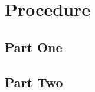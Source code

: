\documentclass{article}
\begin{document}
\section{Procedure}
\label{sec:procedure}

\subsection{Part One}
\label{sec:part_one}


\subsection{Part Two}
\label{sec:part_two}

\end{document}
